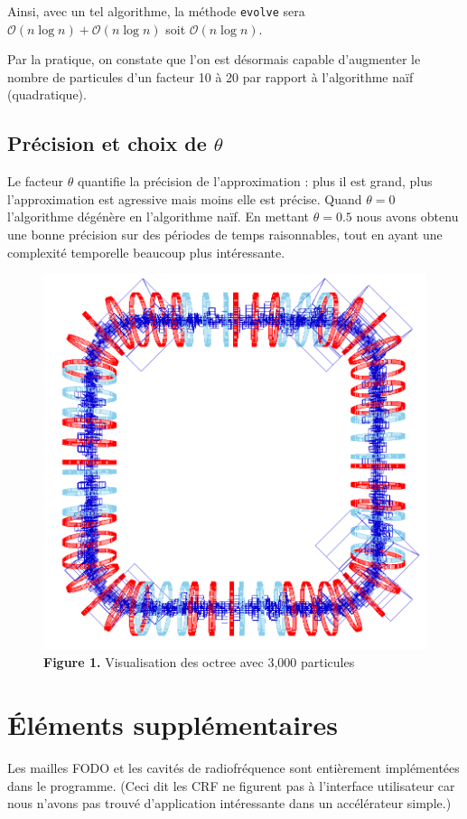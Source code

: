 \documentclass[12pt, letterpaper, twoside]{article}
\newcommand{\T}[1]{\texttt{#1}}
\def\O{\mathcal{O}}
\begin{document}
Ainsi, avec un tel algorithme, la méthode \T{evolve} sera $\O(n \log n) + \O(n \log n)$ soit $\O(n \log n)$.

Par la pratique, on constate que l'on est désormais capable d'augmenter le nombre de particules d'un facteur 10 à 20 par rapport à l'algorithme naïf (quadratique).

\subsection*{Précision et choix de $\theta$}
Le facteur $\theta$ quantifie la précision de l'approximation : plus il est grand, plus l'approximation est agressive mais moins elle est précise. Quand $\theta = 0$ l'algorithme dégénère en l'algorithme naïf. En mettant $\theta = 0.5$ nous avons obtenu une bonne précision sur des périodes de temps raisonnables, tout en ayant une complexité temporelle beaucoup plus intéressante.

\begin{figure}
	\centering
	\includegraphics[width=5in]{images/octree.png}
	\caption{\textbf{Figure 1.} Visualisation des octree avec 3,000 particules}
\end{figure}

\section{Éléments supplémentaires}
Les mailles FODO et les cavités de radiofréquence sont entièrement implémentées dans le programme. (Ceci dit les CRF ne figurent pas à l'interface utilisateur car nous n'avons pas trouvé d'application intéressante dans un accélérateur simple.)
\end{document}

